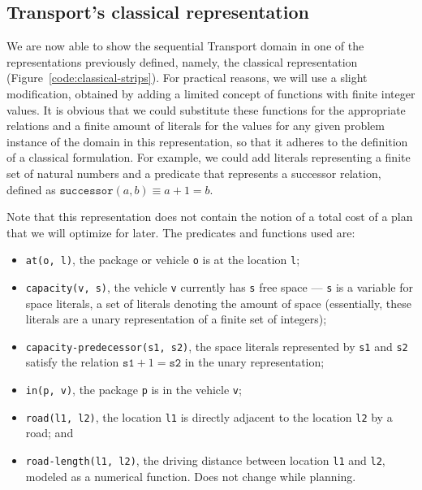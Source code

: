 \subsection{Transport's classical representation}\label{transport-classical-representation}

We are now able to show the sequential Transport domain in one of the representations
previously defined, namely,
the classical representation (Figure~\ref{code:classical-strips}).
For practical reasons, we will use a slight modification, obtained by adding a limited concept of functions
with finite integer values.
It is obvious that we could substitute these functions for the appropriate relations
and a finite amount of literals for the values for any given problem instance of
the domain in this representation,
so that it adheres to the definition of a classical formulation.
For example, we could add literals representing a finite set of
natural numbers and a predicate that represents
a successor relation, defined as $\texttt{successor}(a, b) \equiv a + 1 = b$.

Note that this representation does not contain the notion of a total cost
of a plan that we will optimize for later.
The predicates and functions used are:
\begin{itemize}
\item \verb+at(o, l)+, the package or vehicle \verb+o+ is at the
location \verb+l+;
\item \verb+capacity(v, s)+, the vehicle \verb+v+ currently has \verb+s+ free space --- \verb+s+ is a variable for space literals, a set of literals denoting the amount of space (essentially,
these literals are a unary representation of a finite set of integers);
\item \verb+capacity-predecessor(s1, s2)+, the space literals represented by \verb+s1+ and \verb+s2+
satisfy the relation $\texttt{s1} + 1 = \texttt{s2}$
in the unary representation;
\item \verb+in(p, v)+, the package \verb+p+ is in the vehicle \verb+v+;
\item \verb+road(l1, l2)+, the location \verb+l1+ is directly adjacent to the location
\verb+l2+ by a road; and
\item \verb+road-length(l1, l2)+, the driving distance between location \verb+l1+
and \verb+l2+, modeled as a numerical function. Does not change while planning.
\end{itemize}

